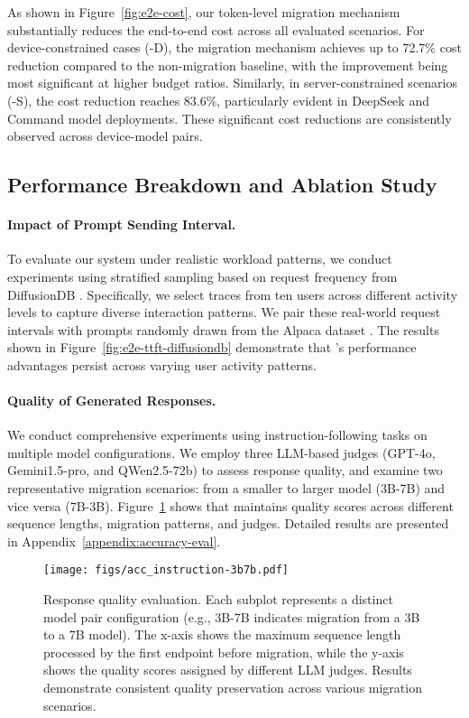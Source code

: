As shown in Figure~\ref{fig:e2e-cost}, our token-level migration mechanism substantially reduces the end-to-end cost across all evaluated scenarios. For device-constrained cases (\disco{}-D), the migration mechanism achieves up to 72.7\% cost reduction compared to the non-migration baseline, with the improvement being most significant at higher budget ratios. Similarly, in server-constrained scenarios (\disco{}-S), the cost reduction reaches 83.6\%, particularly evident in DeepSeek and Command model deployments. These significant cost reductions are consistently observed across device-model pairs.

\subsection{Performance Breakdown and Ablation Study}

\paragraph{Impact of Prompt Sending Interval.} 
To evaluate our system under realistic workload patterns, we conduct experiments using stratified sampling based on request frequency from DiffusionDB \citep{diffusiondb}. Specifically, we select traces from ten users across different activity levels to capture diverse interaction patterns. We pair these real-world request intervals with prompts randomly drawn from the Alpaca dataset \citep{alpaca}. The results shown in Figure~\ref{fig:e2e-ttft-diffusiondb} demonstrate that \disco{}'s performance advantages persist across varying user activity patterns.

\paragraph{Quality of Generated Responses.}
We conduct comprehensive experiments using instruction-following tasks on multiple model configurations. We employ three LLM-based judges (GPT-4o, Gemini1.5-pro, and QWen2.5-72b) to assess response quality, and examine two representative migration scenarios: from a smaller to larger model (3B-7B) and vice versa (7B-3B). Figure~\ref{fig:accuracy_analysis} shows that \disco{} maintains quality scores across different sequence lengths, migration patterns, and judges. Detailed results are presented in Appendix~\ref{appendix:accuracy-eval}.

\begin{figure}[t]
    \centering
    \texttt{[image: figs/acc\_instruction-3b7b.pdf]}
    \vskip -0.1in
    \caption{Response quality evaluation. Each subplot represents a distinct model pair configuration (e.g., 3B-7B indicates migration from a 3B to a 7B model). The x-axis shows the maximum sequence length processed by the first endpoint before migration, while the y-axis shows the quality scores assigned by different LLM judges. Results demonstrate consistent quality preservation across various migration scenarios.}
    \vskip -0.1in
    \label{fig:accuracy_analysis}
\end{figure}


